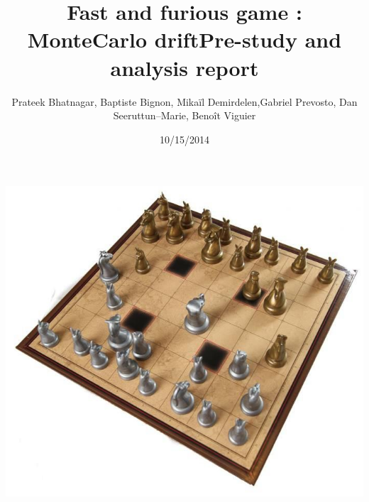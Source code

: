 \documentclass[12pt]{article}
\title{Fast and furious game : MonteCarlo drift\smallbreak Pre-study and analysis report}
\author{Prateek Bhatnagar, Baptiste Bignon, Mikaïl Demirdelen,\endline Gabriel Prevosto, Dan Seeruttun--Marie,  Benoît Viguier}
\date{10/15/2014}
\begin{document}
\maketitle
\includegraphics[scale=0.5]{img/arimaa}
\newpage
\end{document}
